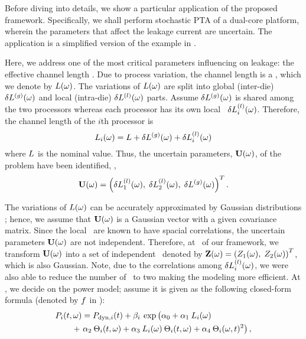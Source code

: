 Before diving into details, we show a particular application of the proposed framework. Specifically, we shall perform stochastic PTA of a dual-core platform, wherein the parameters that affect the leakage current are uncertain. The application is a simplified version of the example in .

Here, we address one of the most critical parameters influencing on leakage: the effective channel length \cite{chandra2010, juan2011, juan2012, srivastava2010, shen2009}. Due to process variation, the channel length is a \rv, which we denote by $L(\omega)$. The variations of $L(\omega)$ are split into global (inter-die) ${\delta L^{(g)}}(\omega)$ and local (intra-die) $\delta L^{(l)}(\omega)$ parts. Assume ${\delta L^{(g)}}(\omega)$ is shared among the two processors whereas each processor has its own local \rv\ $\delta L^{(l)}_i(\omega)$. Therefore, the channel length of the $i$th processor is
\begin{equation} \elabel{leakage-partition}
  \Leff_i(\o) = \nLeff + \gLeff(\o) + \lLeff_i(\o)
\end{equation}
where $L$ is the nominal value. Thus, the uncertain parameters, $\mathbf{U}(\omega)$, of the problem have been identified, \ie,
\[
  \mathbf{U}(\omega) = \left(\delta L^{(l)}_1(\omega), \; \delta L^{(l)}_2(\omega), \; {\delta L^{(g)}}(\omega) \right)^T.
\]


The variations of $L(\omega)$ can be accurately approximated by Gaussian distributions \cite{juan2011, juan2012, srivastava2010}; hence, we assume that $\mathbf{U}(\omega)$ is a Gaussian vector with a given covariance matrix. Since the local \rvs\ are known to have spacial correlations, the uncertain parameters $\mathbf{U}(\omega)$ are not independent. Therefore, at \ of our framework, we transform $\mathbf{U}(\omega)$ into a set of independent \rvs\ denoted by $\mathbf{Z}(\omega) = \left(Z_1(\omega), \; Z_2(\omega)\right)^T$, which is also Gaussian. Note, due to the correlations among $\delta L^{(l)}_i(\omega)$, we were also able to reduce the number of \rvs\ to two making the modeling more efficient. At , we decide on the power model; assume it is given as the following closed-form formula (denoted by $f$ in ):
\begin{align*}
  & \P_i(\t, \o) = \P_{\dyn, i}(\t) + \beta_i \: \exp \left(\vphantom{\T^2_i} \alpha_0 + \alpha_1 \: \Leff_i(\o) \right. \\
  & \qquad {} + \left. \alpha_2 \: \T_i(\t, \o) + \alpha_3 \: \Leff_i(\o) \: \T_i(\t, \o) + \alpha_4 \: \T_i(\o, \t)^2 \right),
\end{align*}
